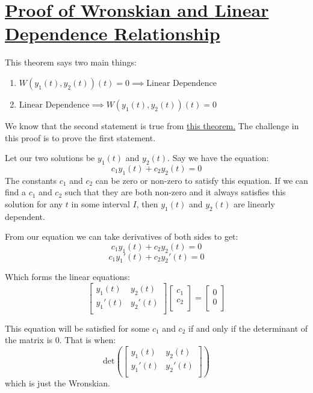 \documentclass{report}
\begin{document}
\section{\hyperref[th:WrLinDep]{Proof of Wronskian and Linear Dependence Relationship}}
\label{sec:PrWrLinDep}
This theorem says two main things:
\begin{enumerate}
    
    \item$W(y_1(t), y_2(t))(t) = 0 \implies \text{Linear Dependence}$
    
    \item$ \text{Linear Dependence} \implies W(y_1(t), y_2(t))(t) = 0$
\end{enumerate}
We know that the second statement is true from \hyperref[th:wronLinDep]{this theorem.} The challenge in this proof is to prove the first statement.

Let our two solutions be $y_1(t)$ and $y_2(t)$. Say we have the equation:
$$c_1y_1(t) +c_2y_2(t) = 0$$
The constants $c_1$ and $c_2$ can be zero or non-zero to satisfy this equation. If we can find a $c_1$ and $c_2$ such that they are both non-zero and it always satisfies this solution for any $t$ in some interval $I$, then $y_1(t)$ and $y_2(t)$ are linearly dependent.

From our equation we can take derivatives of both sides to get:
$$c_1y_1(t) +c_2y_2(t) = 0$$
$$c_1y_1'(t) +c_2y_2'(t) = 0$$

Which forms the linear equations:
$$
\begin{bmatrix}
    y_1(t) & y_2(t) \\
    y_1'(t) & y_2'(t) \\
\end{bmatrix}
\begin{bmatrix}
    c_1 \\
    c_2 \\
\end{bmatrix}
=
\begin{bmatrix}
    0 \\
    0 \\
\end{bmatrix}
$$

This equation will be satisfied for some $c_1$ and $c_2$ if and only if the determinant of the matrix is 0. That is when:
$$
\text{det}\left(\begin{bmatrix}
        y_1(t) & y_2(t) \\
        y_1'(t) & y_2'(t) \\
        \end{bmatrix}\right)
$$
which is just the Wronskian.
\end{document}
